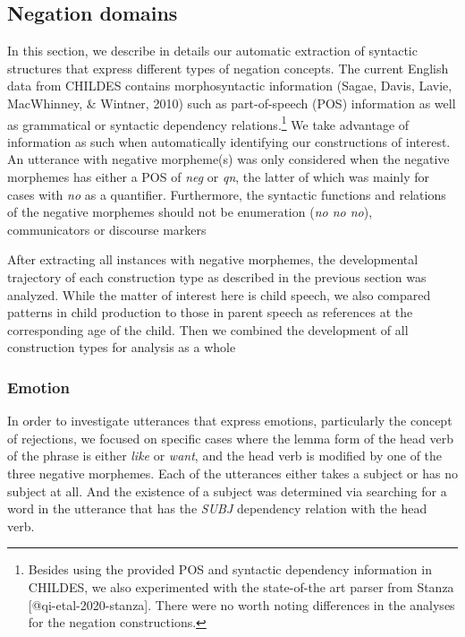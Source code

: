 \documentclass[10pt, letterpaper]{article}
\begin{document}
\hypertarget{negation-domains}{%
\subsection{Negation domains}\label{negation-domains}}

In this section, we describe in details our automatic extraction of
syntactic structures that express different types of negation concepts.
The current English data from CHILDES contains morphosyntactic
information (Sagae, Davis, Lavie, MacWhinney, \& Wintner, 2010) such as
part-of-speech (POS) information as well as grammatical or syntactic
dependency
relations.\footnote{Besides using the provided POS and syntactic dependency information in CHILDES, we also experimented with the state-of-the art parser from Stanza [@qi-etal-2020-stanza]. There were no worth noting differences in the analyses for the negation constructions.}
We take advantage of information as such when automatically identifying
our constructions of interest. An utterance with negative morpheme(s)
was only considered when the negative morphemes has either a POS of
\emph{neg} or \emph{qn}, the latter of which was mainly for cases with
\emph{no} as a quantifier. Furthermore, the syntactic functions and
relations of the negative morphemes should not be enumeration (\emph{no
no no}), communicators or discourse markers

After extracting all instances with negative morphemes, the
developmental trajectory of each construction type as described in the
previous section was analyzed. While the matter of interest here is
child speech, we also compared patterns in child production to those in
parent speech as references at the corresponding age of the child. Then
we combined the development of all construction types for analysis as a
whole

\hypertarget{emotion}{%
\subsubsection{Emotion}\label{emotion}}

In order to investigate utterances that express emotions, particularly
the concept of rejections, we focused on specific cases where the lemma
form of the head verb of the phrase is either \emph{like} or
\emph{want}, and the head verb is modified by one of the three negative
morphemes. Each of the utterances either takes a subject or has no
subject at all. And the existence of a subject was determined via
searching for a word in the utterance that has the \emph{SUBJ}
dependency relation with the head verb.
\end{document}

